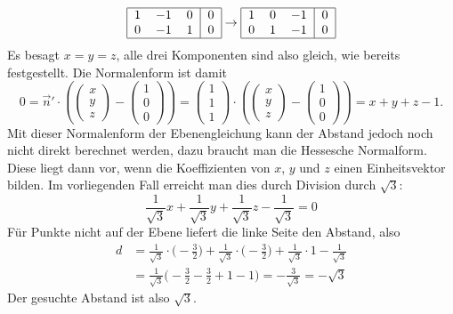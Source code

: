 \begin{loesung}
\[\begin{tabular}{|ccc|c|}
\hline
1&$-1$&0&0\\
0&$-1$&1&0\\
\hline
\end{tabular}
\rightarrow
\begin{tabular}{|ccc|c|}
\hline
1& 0&$-1$&0\\
0& 1&$-1$&0\\
\hline
\end{tabular}
\]
Es besagt $x=y=z$, alle drei Komponenten sind also gleich,
wie bereits festgestellt.
Die Normalenform ist damit
\[
0
=
\vec n'\cdot \left(\begin{pmatrix}x\\y\\z\end{pmatrix}-\begin{pmatrix}1\\0\\0\end{pmatrix}\right)
=
\begin{pmatrix}1\\1\\1\end{pmatrix}
\cdot \left(\begin{pmatrix}x\\y\\z\end{pmatrix}-\begin{pmatrix}1\\0\\0\end{pmatrix}\right)
=
x+y+z-1.
\]
Mit dieser Normalenform der Ebenengleichung kann der Abstand jedoch noch
nicht direkt berechnet werden, dazu braucht man die Hessesche Normalform. 
Diese liegt dann vor, wenn die Koeffizienten von $x$, $y$ und $z$ einen
Einheitsvektor bilden. Im vorliegenden Fall erreicht man dies durch
Division durch $\sqrt{3}$:
\[
\frac1{\sqrt{3}}x
+
\frac1{\sqrt{3}}y
+
\frac1{\sqrt{3}}z
-
\frac1{\sqrt{3}}
=0
\]
Für Punkte nicht auf der Ebene liefert die linke Seite den Abstand,
also 
\begin{align*}
d&=
\frac1{\sqrt{3}}
\cdot
\biggl(-\frac32\biggr)
+
\frac1{\sqrt{3}}
\cdot
\biggl(-\frac32\biggr)
+
\frac1{\sqrt{3}}
\cdot 1
-\frac1{\sqrt{3}}
\\
&=\frac1{\sqrt{3}}\biggl(
-\frac32-\frac32+1-1
\biggr)
=-\frac3{\sqrt{3}}=-\sqrt{3}
\end{align*}
Der gesuchte Abstand ist also $\sqrt{3}$.
\end{loesung}
